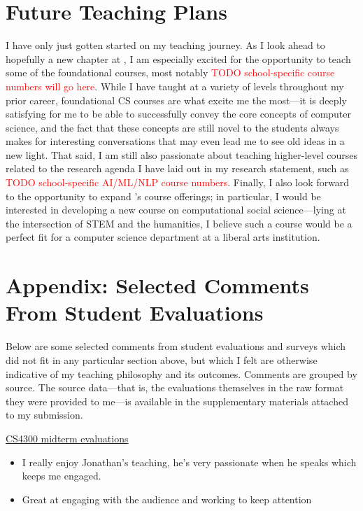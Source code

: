 \documentclass[12pt,letterpaper]{article}
\begin{document}
\section{Future Teaching Plans}
I have only just gotten started on my teaching journey.
As I look ahead to hopefully a new chapter at \schoolname, I am especially excited for the opportunity to teach some of the foundational courses, most notably \textcolor{red}{TODO school-specific course numbers will go here}.
While I have taught at a variety of levels throughout my prior career, foundational CS courses are what excite me the most---it is deeply satisfying for me to be able to successfully convey the core concepts of computer science, and the fact that these concepts are still novel to the students always makes for interesting conversations that may even lead me to see old ideas in a new light.
That said, I am still also passionate about teaching higher-level courses related to the research agenda I have laid out in my research statement, such as \textcolor{red}{TODO school-specific AI/ML/NLP course numbers}.
Finally, I also look forward to the opportunity to expand \schoolname's course offerings; in particular, I would be interested in developing a new course on computational social science---lying at the intersection of STEM and the humanities, I believe such a course would be a perfect fit for a computer science department at a liberal arts institution.

\ifappendix
\vspace{\baselineskip}
\section{Appendix: Selected Comments From Student Evaluations}
Below are some selected comments from student evaluations and surveys which did not fit in any particular section above, but which I felt are otherwise indicative of my teaching philosophy and its outcomes.
Comments are grouped by source.
The source data---that is, the evaluations themselves in the raw format they were provided to me---is available in the supplementary materials attached to my submission.


\noindent\underline{CS4300 midterm evaluations}
\begin{itemize}
    \item I really enjoy Jonathan's teaching, he's very passionate when he speaks which keeps me engaged.
    \item Great at engaging with the audience and working to keep attention
\end{itemize}
\end{document}
